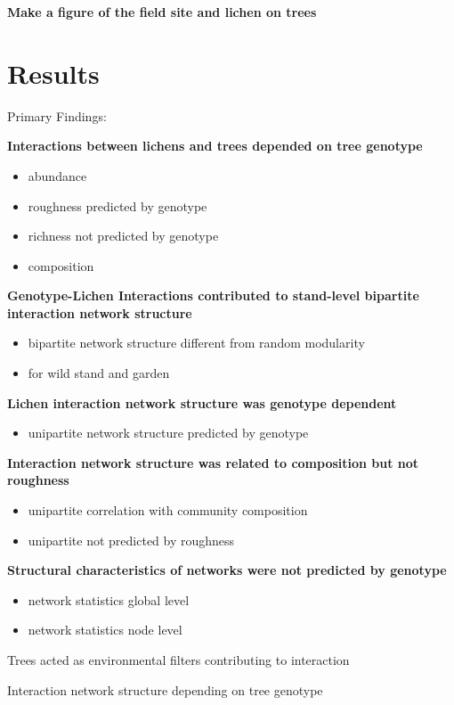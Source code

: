\documentclass[fleqn,10pt]{wlscirep}
\begin{document}
\textbf{Make a figure of the field site and lichen on trees}



\section*{Results}

Primary Findings: 

\textbf{Interactions between lichens and trees depended on tree genotype}
\begin{itemize}
\item abundance
\item roughness predicted by genotype
\item richness not predicted by genotype
\item composition
\end{itemize}

\textbf{Genotype-Lichen Interactions contributed to stand-level
  bipartite interaction network structure}
\begin{itemize}
\item bipartite network structure different from random modularity
\item for wild stand and garden
\end{itemize}

\textbf{Lichen interaction network structure was genotype dependent}
\begin{itemize}
\item unipartite network structure predicted by genotype
\end{itemize}

\textbf{Interaction network structure was related to composition but
  not roughness}
\begin{itemize}
\item unipartite correlation with community composition
\item unipartite not predicted by roughness
\end{itemize}

\textbf{Structural characteristics of networks were not predicted by genotype}
\begin{itemize}
\item network statistics global level
\item network statistics node level
\end{itemize}

Trees acted as environmental filters contributing to interaction

Interaction network structure depending on tree genotype
\end{document}
